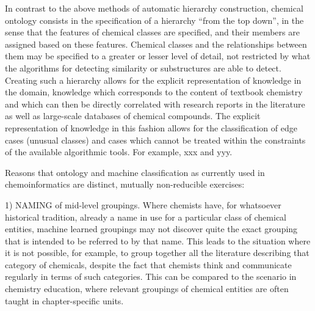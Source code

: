 \documentclass[10pt]{bmc_article}
\newenvironment{bmcformat}{\baselineskip20pt\sloppy\setboolean{publ}{false}}{\baselineskip20pt\sloppy}
\begin{document}
\begin{bmcformat}
In contrast to the above methods of automatic hierarchy construction, chemical ontology consists in the specification of a hierarchy ``from the top down'', in the sense that the features of chemical classes are specified, and their members are assigned based on these features.  Chemical classes and the relationships between them may be specified to a greater or lesser level of detail, not restricted by what the algorithms for detecting similarity or substructures are able to detect. Creating such a hierarchy allows for the explicit representation of knowledge in the domain, knowledge which corresponds to the content of textbook chemistry and which can then be directly correlated with research reports in the literature as well as large-scale databases of chemical compounds. %
The explicit representation of knowledge in this fashion allows for the classification of edge cases (unusual classes) and cases which cannot be treated within the constraints of the available algorithmic tools. For example, xxx and yyy. 




Reasons that ontology and machine classification as currently used in chemoinformatics are distinct, mutually non-reducible exercises:  

1) NAMING of mid-level groupings. Where chemists have, for whatsoever historical tradition, already a name in use for a particular class of chemical entities, machine learned groupings may not discover quite the exact grouping that is intended to be referred to by that name. This leads to the situation where it is not possible, for example, to group together all the literature describing that category of chemicals, despite the fact that chemists think and communicate regularly in terms of such categories.  This can be compared to the scenario in chemistry education, where relevant groupings of chemical entities are often taught in chapter-specific units. %


\end{bmcformat}
\end{document}
